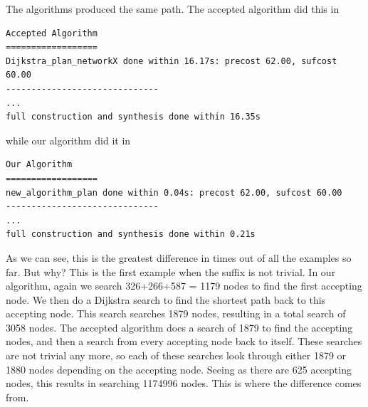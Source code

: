 The algorithms produced the same path. The accepted algorithm did this in 
\begingroup
\fontsize{9pt}{12pt}\selectfont
\begin{lstlisting}
Accepted Algorithm
==================
Dijkstra_plan_networkX done within 16.17s: precost 62.00, sufcost 60.00
------------------------------
...
full construction and synthesis done within 16.35s 
\end{lstlisting}
\endgroup
while our algorithm did it in
\begingroup
\fontsize{9pt}{12pt}\selectfont
\begin{lstlisting}
Our Algorithm
==================
new_algorithm_plan done within 0.04s: precost 62.00, sufcost 60.00
------------------------------
...
full construction and synthesis done within 0.21s 
\end{lstlisting}
\endgroup
As we can see, this is the greatest difference in times out of all the examples so far. But why? This is the first example when the suffix is not trivial. In our algorithm, again we search 326+266+587 = 1179 nodes to find the first accepting node. We then do a Dijkstra search to find the shortest path back to this accepting node. This search searches 1879 nodes, resulting in a total search of 3058 nodes. The accepted algorithm does a search of 1879 to find the accepting nodes, and then a search from every accepting node back to itself. These searches are not trivial any more, so each of these searches look through either 1879 or 1880 nodes depending on the accepting node. Seeing as there are 625 accepting nodes, this results in searching 1174996 nodes. This is where the difference comes from. 
